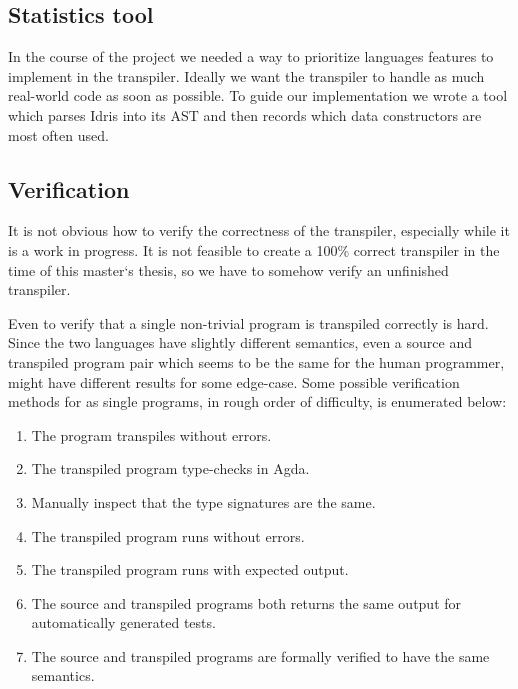 \documentclass[parskip=half]{scrartcl}
\begin{document}
\subsection{Statistics tool}
In the course of the project we needed a way to prioritize languages features
to implement in the transpiler. Ideally we want the transpiler to handle
as much real-world code as soon as possible. To guide our implementation we
wrote a tool which parses Idris into its AST and then records which data
constructors are most often used.




\subsection{Verification}
It is not obvious how to verify the correctness of the transpiler, especially
while it is a work in progress. It is not feasible to create a 100\% correct
transpiler in the time of this master`s thesis, so we have to somehow verify an
unfinished transpiler.

Even to verify that a single non-trivial program is transpiled correctly is
hard. Since the two languages have slightly different semantics, even a source
and transpiled program pair which seems to be the same for the human
programmer, might have different results for some edge-case. Some possible
verification methods for as single programs, in rough order of difficulty, is
enumerated below:

\begin{enumerate}
\item The program transpiles without errors.
\item The transpiled program type-checks in Agda.
\item Manually inspect that the type signatures are the same.
\item The transpiled program runs without errors.
\item The transpiled program runs with expected output.
\item The source and transpiled programs both returns the same output for
  automatically generated tests.
\item The source and transpiled programs are formally verified to have the same
  semantics.
\end{enumerate}
\end{document}
